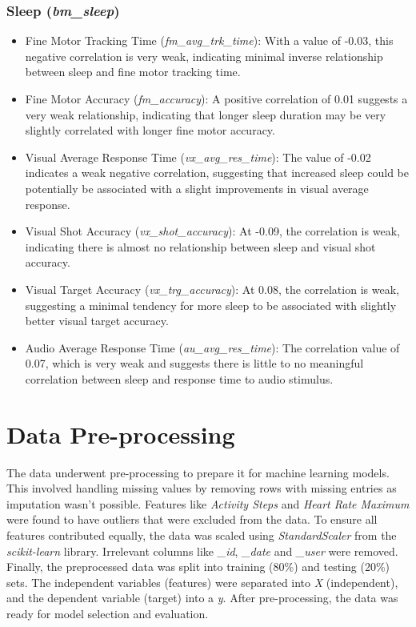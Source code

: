 \subsubsection*{Sleep (\textit{bm\_sleep})}

\begin{itemize}
    \item Fine Motor Tracking Time (\textit{fm\_avg\_trk\_time}): With a value of -0.03, this negative correlation is very weak, indicating minimal inverse relationship between sleep
    and fine motor tracking time.    
        
    \item Fine Motor Accuracy (\textit{fm\_accuracy}): A positive correlation of 0.01 suggests a very weak relationship, indicating that longer sleep duration
    may be very slightly correlated with longer fine motor accuracy.
    
    \item Visual Average Response Time (\textit{vx\_avg\_res\_time}): The value of -0.02 indicates a weak negative correlation, suggesting that increased sleep could be potentially be
    associated with a slight improvements in visual average response. 
    
    \item Visual Shot Accuracy (\textit{vx\_shot\_accuracy}): At -0.09, the correlation is weak, indicating there is almost no relationship between sleep and visual shot accuracy.

    \item Visual Target Accuracy (\textit{vx\_trg\_accuracy}): At 0.08, the correlation is weak, suggesting a minimal tendency for more sleep to be associated with slightly
    better visual target accuracy.
    
    \item Audio Average Response Time (\textit{au\_avg\_res\_time}): The correlation value of 0.07, which is very weak and suggests there is little to no meaningful correlation between
    sleep and response time to audio stimulus.
    
\end{itemize}


\section{Data Pre-processing}
The data underwent pre-processing to prepare it for machine learning models. This involved handling missing values by removing rows with missing entries as imputation wasn't possible.
Features like \textit{Activity Steps} and \textit{Heart Rate Maximum} were found to have outliers that were excluded from the data. 
To ensure all features contributed equally, the data was scaled using \textit{StandardScaler} from the \textit{scikit-learn} library. Irrelevant columns like \textit{\_id}, \textit{\_date} and 
\textit{\_user} were removed. Finally, the preprocessed data was split into training (80\%) and testing (20\%) sets. The independent variables (features) were separated into
\textit{X} (independent), and the dependent variable (target) into a \textit{y}. After pre-processing, the data was ready for model selection and evaluation.


